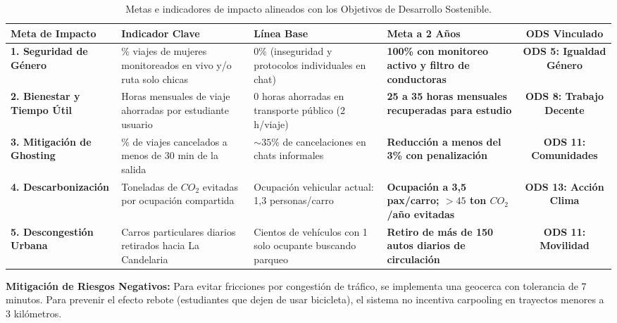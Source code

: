 \documentclass[11pt,a4paper]{article}
\begin{document}
\begin{table}[h!]
\centering
\scriptsize
\renewcommand{\arraystretch}{1.3}
\begin{tabularx}{\textwidth}{p{3.8cm}p{3.2cm}p{2.5cm}p{3.2cm}c}
\toprule
\textbf{Meta de Impacto} & \textbf{Indicador Clave} & \textbf{L\'inea Base} & \textbf{Meta a 2 A\~nos} & \textbf{ODS Vinculado} \\
\midrule
\textbf{1. Seguridad de G\'enero} & \% viajes de mujeres monitoreados en vivo y/o ruta solo chicas & 0\% (inseguridad y protocolos individuales en chat) & \textbf{100\% con monitoreo activo y filtro de conductoras} & \textbf{ODS 5: Igualdad G\'enero} \\
\midrule
\textbf{2. Bienestar y Tiempo \'Util} & Horas mensuales de viaje ahorradas por estudiante usuario & 0 horas ahorradas en transporte p\'ublico (2 h/viaje) & \textbf{25 a 35 horas mensuales recuperadas para estudio} & \textbf{ODS 8: Trabajo Decente} \\
\midrule
\textbf{3. Mitigaci\'on de Ghosting} & \% de viajes cancelados a menos de 30 min de la salida & $\sim 35\%$ de cancelaciones en chats informales & \textbf{Reducci\'on a menos del 3\% con penalizaci\'on} & \textbf{ODS 11: Comunidades} \\
\midrule
\textbf{4. Descarbonizaci\'on} & Toneladas de $CO_2$ evitadas por ocupaci\'on compartida & Ocupaci\'on vehicular actual: 1,3 personas/carro & \textbf{Ocupaci\'on a 3,5 pax/carro; $>45$ ton $CO_2$/a\~no evitadas} & \textbf{ODS 13: Acci\'on Clima} \\
\midrule
\textbf{5. Descongesti\'on Urbana} & Carros particulares diarios retirados hacia La Candelaria & Cientos de veh\'iculos con 1 solo ocupante buscando parqueo & \textbf{Retiro de m\'as de 150 autos diarios de circulaci\'on} & \textbf{ODS 11: Movilidad} \\
\bottomrule
\end{tabularx}
\caption{Metas e indicadores de impacto alineados con los Objetivos de Desarrollo Sostenible.}
\label{tab:ods}
\end{table}

\textbf{Mitigaci\'on de Riesgos Negativos:}  
Para evitar fricciones por congesti\'on de tr\'afico, se implementa una geocerca con tolerancia de 7 minutos. Para prevenir el efecto rebote (estudiantes que dejen de usar bicicleta), el sistema no incentiva carpooling en trayectos menores a 3 kil\'ometros.

\vspace{0.3cm}
\end{document}

